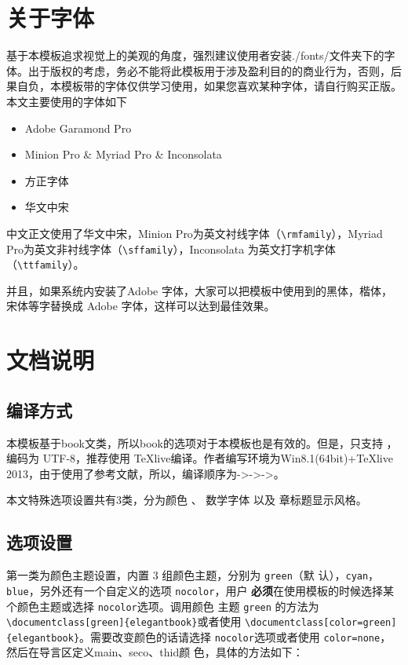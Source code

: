 \documentclass[color=green,mathpazo,titlestyle=hang]{elegantbook}
\begin{document}
\section{关于字体}

基于本模板追求视觉上的美观的角度，强烈建议使用者安装./fonts/文件夹下的字体。出于版权的考虑，务必不能将此模板用于涉及盈利目的的商业行为，否则，后果自负，本模板带的字体仅供学习使用，如果您喜欢某种字体，请自行购买正版。本文主要使用的字体如下
\begin{itemize}
\itemsep=3pt
\parskip=0pt
\item Adobe Garamond Pro
\item Minion Pro \& Myriad Pro  \& Inconsolata
\item 方正字体
\item 华文中宋
\end{itemize}

\begin{note}
中文正文使用了华文中宋，Minion Pro为英文衬线字体（\verb|\rmfamily|），Myriad Pro为英文非衬线字体（\verb|\sffamily|），Inconsolata 为英文打字机字体（\verb|\ttfamily|）。

并且，如果系统内安装了Adobe 字体，大家可以把模板中使用到的黑体，楷体，宋体等字替换成 Adobe 字体，这样可以达到最佳效果。
\end{note}

\section{文档说明}
\subsection{编译方式}
本模板基于book文类，所以book的选项对于本模板也是有效的。但是，只支持 \XeLaTeX{}，编码为 UTF-8，推荐使用 \TeX{}live编译。作者编写环境为Win8.1(64bit)+\TeX{}live 2013，由于使用了参考文献，所以，编译顺序为\XeLaTeX->\BibTeX->\XeLaTeX->\XeLaTeX。

本文特殊选项设置共有3类，分为{\color{main}颜色} 、{\color{main} 数学字体 }以及{\color{main} 章标题显示风格}。

\subsection{选项设置}
第一类为{\color{main}颜色}主题设置，内置 3 组颜色主题，分别为 \verb|green|（默
认），\verb|cyan|，\verb|blue|，另外还有一个自定义的选项 \verb|nocolor|，用户
\textbf{必须}在使用模板的时候选择某个颜色主题或选择 \verb|nocolor|选项。调用颜色
主题 \verb|green| 的方法为\verb|\documentclass[green]{elegantbook}|或者使用
\verb|\documentclass[color=green]{elegantbook}|。需要改变颜色的话请选择
\verb|nocolor|选项或者使用 \verb|color=none|，然后在导言区定义main、seco、thid颜
色，具体的方法如下：
\end{document}
